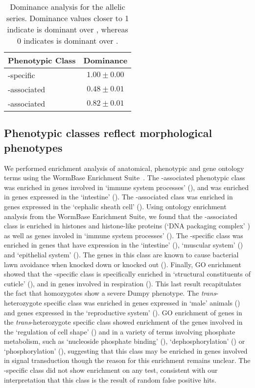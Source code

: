\begin{table}
  \centering
  \begin{tabular}{lc}
    \toprule
    Phenotypic Class & Dominance\\
    \midrule
    \sy{}-specific & $1.00\pm0.00$\\
    \sy{}-associated & $0.48\pm0.01$\\
    \bx{}-associated & $0.82\pm0.01$\\
    \bottomrule
  \end{tabular}
  \caption{
           Dominance analysis for the  allelic series. Dominance
           values closer to 1 indicate \bx{} is dominant over \sy{}, whereas 0
           indicates \sy{} is dominant over \bx{}.
          }
\label{tab:dom}
\end{table}

\subsection*{Phenotypic classes reflect morphological phenotypes}
We performed enrichment analysis of anatomical, phenotypic and gene ontology
terms using the WormBase Enrichment Suite~\citep{Angeles-Albores2016,
Angeles-Albores2018}. The \bx{}-associated phenotypic class was enriched in
genes involved in `immune system processes' (), and was enriched in
genes expressed in the `intestine' (). The \sy{}-associated
class was enriched in genes expressed in the `cephalic sheath
cell' (). Using ontology enrichment analysis from the WormBase
Enrichment Suite, we found that the \sy{}-associated class is enriched in
histones and histone-like proteins (`DNA packaging complex' ) as well as
genes involed in `immune system processes' (). The \sy{}-specific class
was enriched in genes that have expression in the `intestine' (),
`muscular system' () and `epithelial system' (). The genes in
this class are known to cause bacterial lawn avoidance when knocked down or
knocked out (). Finally, GO enrichment showed that the \sy{}-specific
class is specifically enriched in `structural constituents of cuticle'
(), and in genes involved in respiration (). This last result
recapitulates the fact that \sy{} homozygotes show a severe Dumpy phenotype. The
\emph{trans}-heterozygote specific class was enriched in genes expressed in
`male' animals () and genes expressed in the `reproductive system'
(). GO enrichment of genes in the \emph{trans}-heterozygote specific
class showed enrichment of the genes involved in the `regulation of cell shape'
() and in a variety of terms involving phosphate metabolism, such as
`nucleoside phosphate binding' (), `dephosphorylation' () or
`phosphorylation' (), suggesting that this class may be enriched in
genes involved in signal transduction though the reason for this enrichment
remains unclear. The \bx{}-specific class did not show enrichment on any test,
consistent with our interpretation that this class is the result of random false
positive hits.

